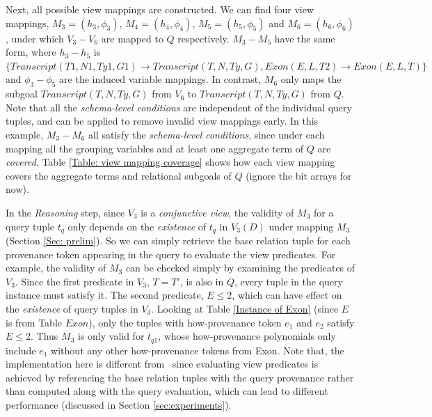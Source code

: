 \begin{example}
Next, all possible view mappings are constructed. We can find four view mappings, $M_3=(h_3,\phi_3)$, $M_4=(h_4, \phi_4)$, $M_5=(h_5, \phi_5)$ and $M_6=(h_6, \phi_6)$, under which $V_3-V_6$ are mapped to $Q$ respectively. $M_3-M_5$ have the same form, where $h_3-h_5$ is $\{Transcript(T1, N1, Ty1, G1) \rightarrow Transcript(T, N, Ty, G), Exon(E, L, T2)\rightarrow Exon(E, L, T)\}$ and $\phi_3-\phi_5$ are the induced variable mappings. In contrast, $M_6$ only maps the subgoal $Transcript(T, N, Ty, G)$ from $V_6$ to $Transcript(T, N, Ty, G)$ from $Q$. Note that all the {\em schema-level conditions} are independent of the individual query tuples, and can be applied to remove invalid view mappings early.  In this example, $M_3-M_6$ all satisfy the {\em schema-level conditions}, since under each mapping all the grouping variables and at least one aggregate term of $Q$ are {\em covered}. Table \ref{Table: view mapping coverage} shows how each view mapping covers the aggregate terms and relational subgoals of $Q$ (ignore the bit arrays for now).

In the {\em Reasoning} step, since $V_3$ is a \textit{conjunctive view}, the validity of $M_3$ for a query tuple $t_q$ only depends on the {\em existence} of $t_q$ in $V_3(D)$ under mapping $M_3$ (Section \ref{Sec: prelim}). So we can simply retrieve the base relation tuple for each provenance token appearing in the query to evaluate the view {predicates}. For example, the validity of $M_3$ can be checked simply by examining the predicates of $V_3$. Since the first predicate in $V_3$, $T = T'$, is also in $Q$, every tuple in the query instance must satisfy it. The second predicate, $E \leq 2$, which can have effect on the {\em existence} of query tuples in $V_3$. Looking at Table \ref{Instance of Exon} (since $E$ is from Table $Exon$), only the tuples with how-provenance token $e_1$ and $e_2$ satisfy $E \leq 2$. Thus $M_3$ is only valid for $t_{{q}1}$, whose how-provenance polynomials only include $e_1$ without any other how-provenance tokens from Exon. Note that, the implementation here is different from \rba\ since evaluating view predicates is achieved by referencing the base relation tuples with the query provenance rather than computed along with the query evaluation, which can lead to different performance (discussed in Section \ref{sec:experiments}).


\end{example}
